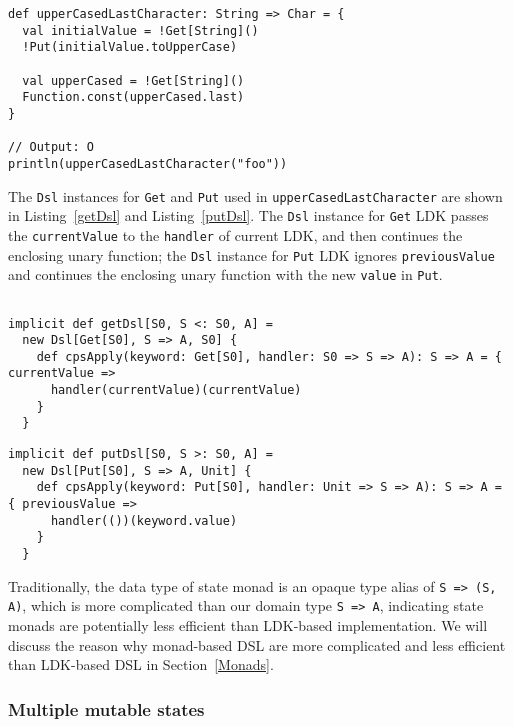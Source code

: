 \begin{lstlisting}[caption={Using \lstinline{Get} and \lstinline{Put} in a unary function},label={upperCasedLastCharacter}]
def upperCasedLastCharacter: String => Char = {
  val initialValue = !Get[String]()
  !Put(initialValue.toUpperCase)

  val upperCased = !Get[String]()
  Function.const(upperCased.last)
}

// Output: O
println(upperCasedLastCharacter("foo"))
\end{lstlisting}

The \lstinline{Dsl} instances for \lstinline{Get} and \lstinline{Put} used in \lstinline{upperCasedLastCharacter} are shown in Listing~\ref{getDsl} and Listing~\ref{putDsl}. The \lstinline{Dsl} instance for \lstinline{Get} LDK passes the \lstinline{currentValue} to the \lstinline{handler} of current LDK, and then continues the enclosing unary function; the \lstinline{Dsl} instance for \lstinline{Put} LDK ignores \lstinline{previousValue} and continues the enclosing unary function with the new \lstinline{value} in \lstinline{Put}.

\begin{lstlisting}[caption={The \lstinline{Dsl} instance for \lstinline{Get} LDK},label={getDsl}]

implicit def getDsl[S0, S <: S0, A] =
  new Dsl[Get[S0], S => A, S0] {
    def cpsApply(keyword: Get[S0], handler: S0 => S => A): S => A = { currentValue =>
      handler(currentValue)(currentValue)
    }
  }
\end{lstlisting}

\begin{lstlisting}[caption={The \lstinline{Dsl} instance for \lstinline{Put} LDK},label={putDsl}]
implicit def putDsl[S0, S >: S0, A] =
  new Dsl[Put[S0], S => A, Unit] {
    def cpsApply(keyword: Put[S0], handler: Unit => S => A): S => A = { previousValue =>
      handler(())(keyword.value)
    }
  }
\end{lstlisting}

Traditionally, the data type of state monad is an opaque type alias of \lstinline{S => (S, A)}, which is more complicated than our domain type \lstinline{S => A}, indicating state monads are potentially less efficient than LDK-based implementation. We will discuss the reason why monad-based DSL are more complicated and less efficient than LDK-based DSL in Section~\ref{Monads}.

\subsubsection{Multiple mutable states}\label{Multiple mutable states}

